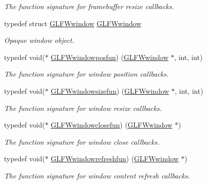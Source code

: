 \begin{DoxyCompactItemize}
\begin{DoxyCompactList}\small\item\em The function signature for framebuffer resize callbacks. \end{DoxyCompactList}\item 
typedef struct \hyperlink{group__window_ga3c96d80d363e67d13a41b5d1821f3242}{G\+L\+F\+Wwindow} \hyperlink{group__window_ga3c96d80d363e67d13a41b5d1821f3242}{G\+L\+F\+Wwindow}
\begin{DoxyCompactList}\small\item\em Opaque window object. \end{DoxyCompactList}\item 
typedef void($\ast$ \hyperlink{group__window_gafd8db81fdb0e850549dc6bace5ed697a}{G\+L\+F\+Wwindowposfun}) (\hyperlink{group__window_ga3c96d80d363e67d13a41b5d1821f3242}{G\+L\+F\+Wwindow} $\ast$, int, int)
\begin{DoxyCompactList}\small\item\em The function signature for window position callbacks. \end{DoxyCompactList}\item 
typedef void($\ast$ \hyperlink{group__window_gae49ee6ebc03fa2da024b89943a331355}{G\+L\+F\+Wwindowsizefun}) (\hyperlink{group__window_ga3c96d80d363e67d13a41b5d1821f3242}{G\+L\+F\+Wwindow} $\ast$, int, int)
\begin{DoxyCompactList}\small\item\em The function signature for window resize callbacks. \end{DoxyCompactList}\item 
typedef void($\ast$ \hyperlink{group__window_ga93e7c2555bd837f4ed8b20f76cada72e}{G\+L\+F\+Wwindowclosefun}) (\hyperlink{group__window_ga3c96d80d363e67d13a41b5d1821f3242}{G\+L\+F\+Wwindow} $\ast$)
\begin{DoxyCompactList}\small\item\em The function signature for window close callbacks. \end{DoxyCompactList}\item 
typedef void($\ast$ \hyperlink{group__window_ga7a56f9e0227e2cd9470d80d919032e08}{G\+L\+F\+Wwindowrefreshfun}) (\hyperlink{group__window_ga3c96d80d363e67d13a41b5d1821f3242}{G\+L\+F\+Wwindow} $\ast$)
\begin{DoxyCompactList}\small\item\em The function signature for window content refresh callbacks. \end{DoxyCompactList}\item 

\end{DoxyCompactItemize}
